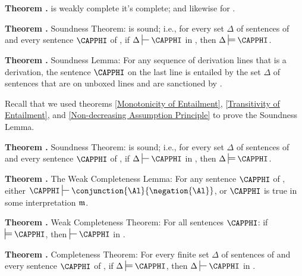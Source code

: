 \begin{majorILnc}{\textbf{Theorem .}}
\GSD{} is weakly complete \Iff it's complete; and likewise for \GQD{}.
\end{majorILnc}

\begin{majorILnc}{\textbf{Theorem .} \GSD{} Soundness Theorem:}
\GSD{} is sound; i.e., for every set $\Delta$ of sentences of \GSL{} and every sentence $\CAPPHI$ of \GSL{}, if $\Delta\sststile{}{}\CAPPHI$ in \GSD{}, then $\Delta\sdtstile{}{}\CAPPHI$.
\end{majorILnc}

\begin{majorILnc}{\textbf{Theorem .} Soundness Lemma:}
For any sequence of derivation lines that is a derivation, the sentence $\CAPPHI$ on the last line is entailed by the set $\Delta$ of sentences that are on unboxed lines and are sanctioned by . 
\end{majorILnc}

\noindent{}Recall that we used theorems \ref{Monotonicity of Entailment}, \ref{Transitivity of Entailment}, and \ref{Non-decreasing Assumption Principle} to prove the Soundness Lemma.

\begin{majorILnc}{\textbf{Theorem .} \GQD{} Soundness Theorem:}
\GQD{} is sound; i.e., for every set $\Delta$ of sentences of \GQL{} and every sentence $\CAPPHI$ of \GQL{}, if $\Delta\sststile{}{}\CAPPHI$ in \GSD{}, then $\Delta\sdtstile{}{}\CAPPHI$.
\end{majorILnc}

\begin{majorILnc}{\textbf{Theorem .} The \GSD{} Weak Completeness Lemma:}
For any sentence $\CAPPHI$ of \GSD{}, either $\CAPPHI\sststile{}{}\conjunction{\Al}{\negation{\Al}}$, or $\CAPPHI$ is true in some interpretation $\mathfrak{m}$.
\end{majorILnc}

\begin{majorILnc}{\textbf{Theorem .} Weak \GSD{} Completeness Theorem:}
For all \GSL{} sentences $\CAPPHI$: if $\sdtstile{}{}\CAPPHI$, then $\sststile{}{}\CAPPHI$ in \GSD{}.
\end{majorILnc}

\begin{majorILnc}{\textbf{Theorem .} \GSD{} Completeness Theorem:}
For every finite set $\Delta$ of sentences of \GSL{} and every sentence $\CAPPHI$ of \GSL{}, if $\Delta\sdtstile{}{}\CAPPHI$, then $\Delta\sststile{}{}\CAPPHI$ in \GSD{}.
\end{majorILnc}

